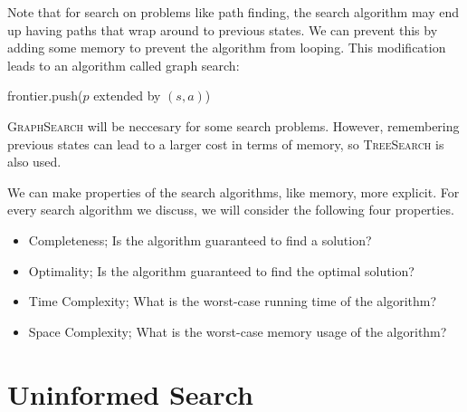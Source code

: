 \documentclass[11pt]{article}
\begin{document}
Note that for search on problems like path finding, the search algorithm 
may end up having paths that wrap around to previous states. We can 
prevent this by adding some memory to prevent the algorithm
from looping. This modification leads to an algorithm called graph search:

\begin{algorithm}
\begin{algorithmic}[1]
  \EndIf{}
  frontier.push($p$ extended by $(s,a)$)
  \EndIf{}
  \EndFor{}
  \EndWhile{}
  \EndProcedure{}
\end{algorithmic}
\end{algorithm}

\textsc{GraphSearch} will be neccesary for some search
problems. However, remembering previous states can lead to a larger
cost in terms of memory, so \textsc{TreeSearch} is also used.

We can make properties of the search algorithms, like memory, more
explicit. For every search algorithm we discuss, we will consider the
following four properties.


\begin{itemize}
\item Completeness; Is the algorithm guaranteed to find a solution?
\item Optimality; Is the algorithm guaranteed to find the optimal solution?
\item Time Complexity; What is the worst-case running time of the algorithm?
\item Space Complexity; What is the worst-case memory usage of the algorithm?
\end{itemize}


\section{Uninformed Search}
\end{document}
